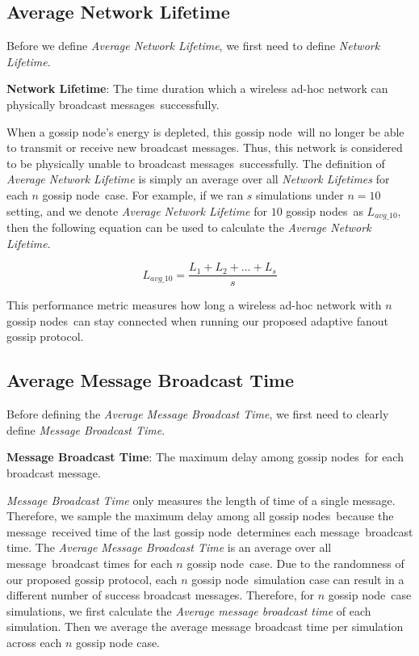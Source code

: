 \documentclass[onehalf,11pt]{beavtex}
\newcommand{\gp}{gossip protocol}
\newcommand{\msgs}{messages}
\newcommand{\msg}{message}
\newcommand{\gn}{gossip node}
\newcommand{\gns}{gossip nodes}
\begin{document}
\subsection{Average Network Lifetime}

Before we define \emph{Average Network Lifetime}, we first need to define \emph{Network Lifetime}. 

\textbf{Network Lifetime}: The time duration which a wireless ad-hoc network can physically broadcast \msgs ~successfully.

When a \gn's energy is depleted, this \gn ~will no longer be able to transmit or receive new broadcast \msgs. Thus, this network is considered to be physically unable to broadcast \msgs ~successfully. The definition of \emph{Average Network Lifetime} is simply an average over all \emph{Network Lifetimes} for each $n$ \gn ~case. For example, if we ran $s$ simulations under $n=10$ setting, and we denote \emph{Average Network Lifetime} for $10$ \gns ~as $L_{avg\_10}$, then the following equation can be used to calculate the \emph{Average Network Lifetime}.

\[ L_{avg\_10} =\frac{L_1 + L_2 + \ldots + L_{s}}{s} \]

This performance metric measures how long a wireless ad-hoc network with $n$ \gns ~can stay connected when running our proposed adaptive fanout \gp.

\subsection{Average Message Broadcast Time}

Before defining the \emph{Average Message Broadcast Time}, we first need to clearly define \emph{Message Broadcast Time}.

\textbf{Message Broadcast Time}: The maximum delay among \gns ~for each broadcast \msg.

\emph{Message Broadcast Time} only measures the length of time of a single \msg. Therefore, we sample the maximum delay among all \gns ~because the \msg ~received time of the last \gn ~determines each \msg ~broadcast time. The \emph{Average Message Broadcast Time} is an average over all \msg ~broadcast times for each $n$ \gn ~case. Due to the randomness of our proposed \gp, each $n$ \gn ~simulation case can result in a different number of success broadcast \msgs. Therefore, for $n$ \gn ~case simulations, we first calculate the \emph{Average message broadcast time} of each simulation. Then we average the average message broadcast time per simulation across each $n$ gossip node case.
\end{document}
